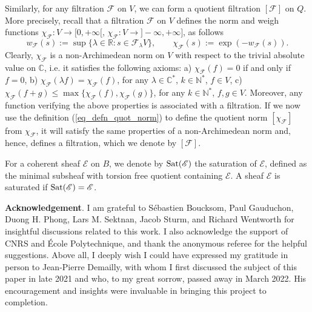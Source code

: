 \documentclass[12pt]{article}
\numberwithin{equation}{section}
\theoremstyle{theorem}
\theoremstyle{definition}
\theoremstyle{remark}
\newcommand{\comp}{\mathbb{C}}
\newcommand{\real}{\mathbb{R}}
\newcommand{\nat}{\mathbb{N}}
\begin{document}
	Similarly, for any filtration $\mathcal{F}$ on $V$, we can form a quotient filtration $[\mathcal{F}]$ on $Q$.
	More precisely, recall that a filtration $\mathcal{F}$ on $V$ defines the norm and weigh functions $\chi_{\mathcal{F}} : V \to [0, +\infty[$,  $\chi_{\mathcal{F}} : V \to ]- \infty, +\infty]$, as follows
	\begin{equation}\label{eq_na_norm}
		w_{\mathcal{F}}(s) := \sup \{ \lambda \in \real : s \in \mathcal{F}_{\lambda} V \},
		\qquad
		\chi_{\mathcal{F}}(s) := \exp(- w_{\mathcal{F}}(s)).
	\end{equation}
	Clearly, $\chi_{\mathcal{F}}$ is a non-Archimedean norm on $V$ with respect to the trivial absolute value on $\comp$, i.e. it satisfies the following axioms: a) $\chi_{\mathcal{F}}(f) = 0$ if and only if $f = 0$,
	b) $\chi_{\mathcal{F}}(\lambda f) = \chi_{\mathcal{F}}(f)$, for any $\lambda \in \comp^*$, $k \in \nat^*$, $f \in V$,
	c) $\chi_{\mathcal{F}}(f + g) \leq \max \{ \chi_{\mathcal{F}}(f), \chi_{\mathcal{F}}(g) \}$, for any $k \in \nat^*$, $f, g \in V$.
	Moreover, any function verifying the above properties is associated with a filtration. 
	If we now use the definition (\ref{eq_defn_quot_norm}) to define the quotient norm $[\chi_{\mathcal{F}}]$ from $\chi_{\mathcal{F}}$, it will satisfy the same properties of a non-Archimedean norm and, hence, defines a filtration, which we denote by $[\mathcal{F}]$.
	\par 
	For a coherent sheaf $\mathscr{E}$ on $B$, we denote by ${\rm{Sat}}(\mathscr{E})$ the saturation of $\mathscr{E}$, defined as the minimal subsheaf with torsion free quotient containing $\mathscr{E}$. 
	A sheaf $\mathscr{E}$ is saturated if ${\rm{Sat}}(\mathscr{E}) = \mathscr{E}$.
	\par 
	\textbf{Acknowledgement}. 
	I am grateful to Sébastien Boucksom, Paul Gauduchon, Duong H. Phong, Lars M. Sektnan, Jacob Sturm, and Richard Wentworth for insightful discussions related to this work. 
	I also acknowledge the support of CNRS and École Polytechnique, and thank the anonymous referee for the helpful suggestions.
	Above all, I deeply wish I could have expressed my gratitude in person to Jean-Pierre Demailly, with whom I first discussed the subject of this paper in late 2021 and who, to my great sorrow, passed away in March 2022. 
	His encouragement and insights were invaluable in bringing this project to completion.
	
\end{document}
